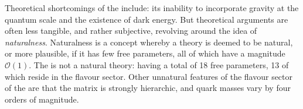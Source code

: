 Theoretical shortcomings of the \sm include: its inability to incorporate gravity at the quantum
scale and the existence of dark energy.
But theoretical arguments are often less tangible, and
rather subjective, revolving around the idea of \emph{naturalness}.
Naturalness is a concept whereby a theory is deemed to be natural, or more plausible, if it has few
free parameters, all of which have a magnitude $\mathcal{O}(1)$.
The \sm is not a natural theory: having
a total of 18 free parameters, 13 of which reside in the flavour
sector.
Other unnatural features of the flavour sector of the \sm are that the \ckm matrix is strongly
hierarchic, and quark masses vary by four orders of magnitude.

